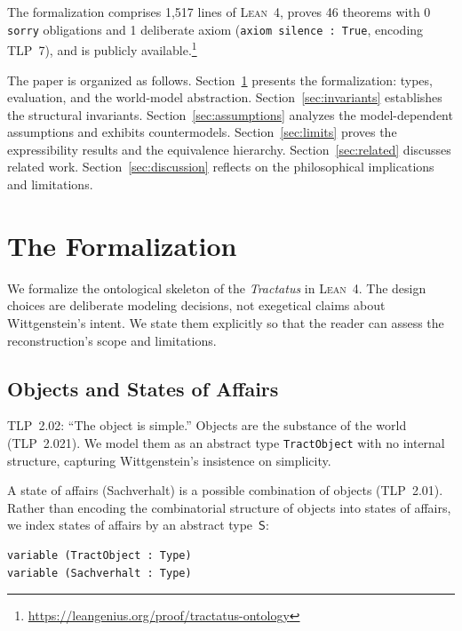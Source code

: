 \documentclass[10pt, letterpaper]{article}
\theoremstyle{definition}
\theoremstyle{remark}
\newcommand{\Sach}{\mathsf{S}}
\newcommand{\Lean}{\textsc{Lean}}
\begin{document}
\noindent
The formalization comprises 1,517 lines of \Lean~4, proves 46
theorems with 0 \texttt{sorry} obligations and 1 deliberate
axiom (\texttt{axiom silence : True}, encoding TLP~7), and is
publicly available.\footnote{\url{https://leangenius.org/proof/tractatus-ontology}}

The paper is organized as follows.
Section~\ref{sec:formalization} presents the formalization:
types, evaluation, and the world-model abstraction.
Section~\ref{sec:invariants} establishes the structural
invariants.
Section~\ref{sec:assumptions} analyzes the model-dependent
assumptions and exhibits countermodels.
Section~\ref{sec:limits} proves the expressibility results and
the equivalence hierarchy.
Section~\ref{sec:related} discusses related work.
Section~\ref{sec:discussion} reflects on the philosophical
implications and limitations.

\section{The Formalization}
\label{sec:formalization}

We formalize the ontological skeleton of the \emph{Tractatus}
in \Lean~4.  The design choices are deliberate modeling
decisions, not exegetical claims about Wittgenstein's intent.
We state them explicitly so that the reader can assess the
reconstruction's scope and limitations.

\subsection{Objects and States of Affairs}
\label{sec:objects}

TLP~2.02: ``The object is simple.''  Objects are the substance
of the world (TLP~2.021).  We model them as an abstract type
\texttt{TractObject} with no internal structure, capturing
Wittgenstein's insistence on simplicity.

A state of affairs (Sachverhalt) is a possible combination of
objects (TLP~2.01).  Rather than encoding the combinatorial
structure of objects into states of affairs, we index states of
affairs by an abstract type~$\Sach$:

\begin{lstlisting}
variable (TractObject : Type)
variable (Sachverhalt : Type)
\end{lstlisting}
\end{document}
